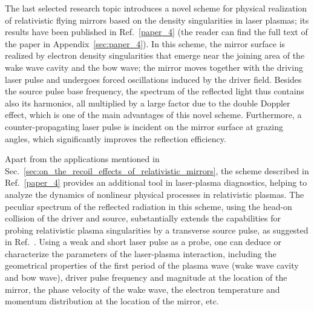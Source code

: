 \documentclass[10pt, a4paper, twoside, openright]{report}
\begin{document}
The last selected research topic introduces a novel scheme for physical realization of relativistic flying mirrors based on the density singularities in laser plasmas; its results have been published in Ref.~\ref{paper_4} (the reader can find the full text of the paper in Appendix~\ref{sec:paper_4}). In this scheme, the mirror surface is realized by electron density singularities that emerge near the joining area of the wake wave cavity and the bow wave; the mirror moves together with the driving laser pulse and undergoes forced oscillations induced by the driver field. Besides the source pulse base frequency, the spectrum of the reflected light thus contains also its harmonics, all multiplied by a large factor due to the double Doppler effect, which is one of the main advantages of this novel scheme. Furthermore, a counter-propagating laser pulse is incident on the mirror surface at grazing angles, which significantly improves the reflection efficiency.

Apart from the applications mentioned in Sec.~\ref{sec:on_the_recoil_effects_of_relativistic_mirrors}, the scheme described in Ref.~\ref{paper_4} provides an additional tool in laser-plasma diagnostics, helping to analyze the dynamics of nonlinear physical processes in relativistic plasmas. The peculiar spectrum of the reflected radiation in this scheme, using the head-on collision of the driver and source, substantially extends the capabilities for probing relativistic plasma singularities by a transverse source pulse, as suggested in Ref.~. Using a weak and short laser pulse as a probe, one can deduce or characterize the parameters of the laser-plasma interaction, including the geometrical properties of the first period of the plasma wave (wake wave cavity and bow wave), driver pulse frequency and magnitude at the location of the mirror, the phase velocity of the wake wave, the electron temperature and momentum distribution at the location of the mirror, etc. 
\end{document}
